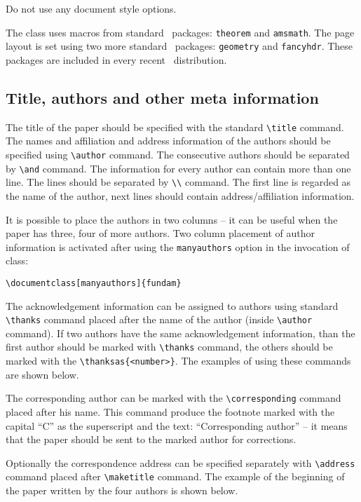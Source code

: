 \documentclass{fundam}
\begin{document}
\noindent
Do not use any document style options.

The class uses macros from standard \LaTeXe\ packages:
\texttt{theorem} and \texttt{amsmath}. The page layout is set using two more  standard \LaTeXe\ packages: \texttt{geometry} and \texttt{fancyhdr}. These packages are included in
every recent \LaTeXe\ distribution.

\subsection{Title, authors and other meta information}

The title of the paper should be specified with the standard
\verb|\title| command.  The names and affiliation and address
information of the authors should be specified using \verb|\author|
command. The consecutive authors should be separated by \verb|\and|
command. The information for every author can contain more than one
line. The lines should be separated by \verb|\\| command. The first
line is regarded as the name of the author, next lines should contain
address/affiliation information.

It is possible to place the authors in two columns -- it can be useful
when the paper has three, four of more authors. Two column placement
of author information is activated after using the
\texttt{manyauthors} option in the invocation of class:

\begin{verbatim}
\documentclass[manyauthors]{fundam}
\end{verbatim}

The acknowledgement information can be assigned to authors using
standard \verb|\thanks| command placed after the name of the author
(inside \verb|\author| command). If two authors have the same
acknowledgement information, than the first author should be marked
with \verb|\thanks| command, the others should be marked with the
\verb|\thanksas{<number>}|. The examples of using these commands are
shown below.

The corresponding author can be marked with the \verb|\corresponding|
command placed after his name. This command produce the footnote
marked with the capital ``C'' as the superscript and the text:
``Corresponding author'' -- it means that the paper should be sent to
the marked author for corrections.

Optionally the correspondence address can be specified separately with
\verb|\address| command placed after \verb|\maketitle| command. The
example of the beginning of the paper written by the four authors is
shown below.
\end{document}
